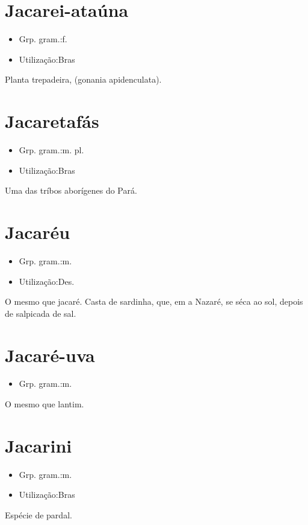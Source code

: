 \documentclass{article}
\begin{document}
\section{Jacarei-ataúna}
\begin{itemize}
\item {Grp. gram.:f.}
\end{itemize}
\begin{itemize}
\item {Utilização:Bras}
\end{itemize}
Planta trepadeira, (\textunderscore gonania apidenculata\textunderscore ).
\section{Jacaretafás}
\begin{itemize}
\item {Grp. gram.:m. pl.}
\end{itemize}
\begin{itemize}
\item {Utilização:Bras}
\end{itemize}
Uma das tríbos aborígenes do Pará.
\section{Jacaréu}
\begin{itemize}
\item {Grp. gram.:m.}
\end{itemize}
\begin{itemize}
\item {Utilização:Des.}
\end{itemize}
O mesmo que \textunderscore jacaré\textunderscore .
Casta de sardinha, que, em a Nazaré, se séca ao sol, depois de salpicada de sal.
\section{Jacaré-uva}
\begin{itemize}
\item {Grp. gram.:m.}
\end{itemize}
O mesmo que \textunderscore lantim\textunderscore .
\section{Jacarini}
\begin{itemize}
\item {Grp. gram.:m.}
\end{itemize}
\begin{itemize}
\item {Utilização:Bras}
\end{itemize}
Espécie de pardal.
\end{document}
